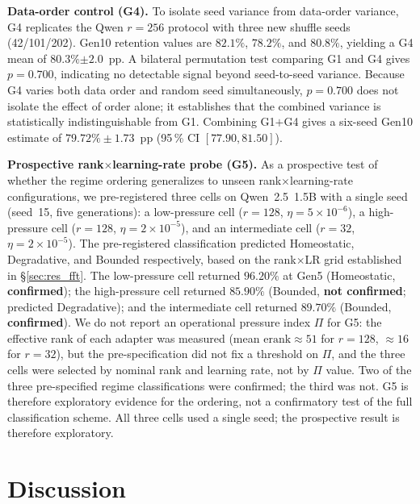 \documentclass[a4paper,fleqn]{cas-dc}
\newif\ifshowchanges
\newcommand{\rev}[1]{\ifshowchanges{\color{blue}#1}\else{#1}\fi}
\begin{document}
\rev{\textbf{Data-order control (G4).}
To isolate seed variance from data-order variance, G4 replicates the Qwen
$r=256$ protocol with three new shuffle seeds (42/101/202). Gen10 retention
values are $82.1\%$, $78.2\%$, and $80.8\%$, yielding a G4 mean of \rev{$80.3\%$}$\pm2.0$~pp.
A bilateral permutation test comparing G1 and G4 gives $p=0.700$, indicating
no detectable signal beyond seed-to-seed variance. Because G4 varies both data
order and random seed simultaneously, $p=0.700$ does not isolate the
effect of order alone; it establishes that the combined variance is
statistically indistinguishable from G1. Combining G1$+$G4 gives a six-seed
Gen10 estimate of $79.72\%\pm1.73$~pp
(95\,\% CI $[77.90, 81.50]$).}

\rev{\textbf{Prospective rank$\times$learning-rate probe (G5).}
As a prospective test of whether the regime ordering generalizes to unseen
rank$\times$learning-rate configurations, we pre-registered three cells on
Qwen~2.5~1.5B with a single seed (seed~15, five generations): a low-pressure
cell ($r=128$, $\eta=5\times10^{-6}$), a high-pressure cell ($r=128$,
$\eta=2\times10^{-5}$), and an intermediate cell ($r=32$, $\eta=2\times10^{-5}$).
The pre-registered classification predicted Homeostatic, Degradative, and
Bounded respectively, based on the rank$\times$LR grid established in
\S\ref{sec:res_fft}.
The low-pressure cell returned $96.20\%$ at Gen5
(Homeostatic, \textbf{confirmed}); the high-pressure cell returned
$85.90\%$ (Bounded, \textbf{not confirmed}; predicted
Degradative); and the intermediate cell returned $89.70\%$
(Bounded, \textbf{confirmed}).
We do not report an operational pressure index $\Pi$ for G5: the effective rank
of each adapter was measured (mean $\mathrm{erank}\approx51$ for $r=128$,
$\approx16$ for $r=32$), but the pre-specification did not fix a threshold on
$\Pi$, and the three cells were selected by nominal rank and learning rate, not
by $\Pi$ value. \rev{Two of the three pre-specified regime classifications were confirmed; the third was not.} G5 is therefore exploratory evidence for the ordering, not a confirmatory
test of the full classification scheme.
All three cells used a single seed; the prospective result is therefore exploratory.}
\section{Discussion}\label{sec:discussion}
\end{document}
